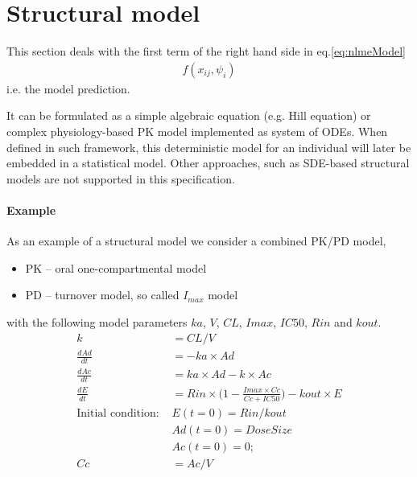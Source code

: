 \section{Structural model}
\label{sec:structuralModel}
This section deals with the first term of the right hand side in eq.\ref{eq:nlmeModel}
\begin{align*}
	f(x_{ij}, \psi_{i}) 
\end{align*}
i.e. the model prediction.

It can be formulated as a simple algebraic equation (e.g. Hill equation) or complex physiology-based PK model implemented as system of ODEs. When defined in such framework, this deterministic model for an individual will later be embedded in a statistical model. Other approaches, such as SDE-based structural models are not supported in this specification.

\paragraph{Example}
As an example of a structural model we consider a combined PK/PD model, %
\begin{itemize}
\item
PK -- oral one-compartmental model
\item
PD -- turnover model, so called $I_{max}$ model
\end{itemize}
with the following model parameters $ka$, $V$, $CL$, $Imax$, $IC50$, $Rin$ and $kout$.
\begin{align*}
k&=CL/V  \\
\frac{dAd}{dt} &=-ka\times Ad  \\
\frac{dAc}{dt}&=ka \times Ad - k \times Ac  \\
\frac{dE}{dt}&=Rin \times \Bigg(1-\frac{Imax \times Cc}{Cc+IC50}\Bigg) - kout \times E \\
\mbox{Initial condition: } & E(t=0) = Rin/kout   \\
& Ad(t=0) = DoseSize  \\
& Ac(t=0) = 0;  \\
Cc &= Ac/V  
\end{align*}

